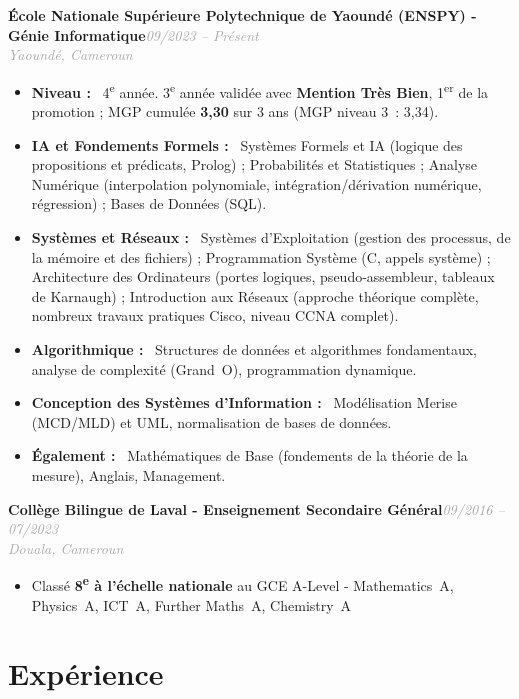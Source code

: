 \documentclass[10pt, a4paper]{article}
\newcommand{\entryhead}[2]{%
  \noindent\textbf{#1}\hfill{\small\textit{\textcolor{darkgray}{#2}}}\\[-4pt]%
}
\newcommand{\entrysub}[1]{%
  {\small\textit{\textcolor{darkgray}{#1}}}\\[2pt]%
}
\newcommand{\blabel}[1]{\textbf{#1}\ }
\begin{document}
\entryhead{École Nationale Supérieure Polytechnique de Yaoundé (ENSPY) - Génie Informatique}{09/2023 -- Présent}
\entrysub{Yaoundé, Cameroun}
\begin{itemize}
  \item \blabel{Niveau :} 4\textsuperscript{e} année. 3\textsuperscript{e} année validée avec
        \textbf{Mention Très Bien}, 1\textsuperscript{er} de la promotion ; MGP cumulée
        \textbf{3,30} sur 3 ans (MGP niveau 3~: 3,34).
  \item \blabel{IA et Fondements Formels :} Systèmes Formels et IA (logique des propositions et
        prédicats, Prolog) ; Probabilités et Statistiques ; Analyse Numérique (interpolation
        polynomiale, intégration/dérivation numérique, régression) ; Bases de Données (SQL).
  \item \blabel{Systèmes et Réseaux :} Systèmes d'Exploitation (gestion des processus, de la
        mémoire et des fichiers) ; Programmation Système (C, appels système) ; Architecture des
        Ordinateurs (portes logiques, pseudo-assembleur, tableaux de Karnaugh) ; Introduction aux
        Réseaux (approche théorique complète, nombreux travaux pratiques Cisco, niveau CCNA
        complet).
  \item \blabel{Algorithmique :} Structures de données et algorithmes fondamentaux, analyse de
        complexité (Grand~O), programmation dynamique.
  \item \blabel{Conception des Systèmes d'Information :} Modélisation Merise (MCD/MLD) et UML,
        normalisation de bases de données.
  \item \blabel{Également :} Mathématiques de Base (fondements de la théorie de la mesure),
        Anglais, Management.
\end{itemize}

\vspace{4pt}
\entryhead{Collège Bilingue de Laval - Enseignement Secondaire Général}{09/2016 -- 07/2023}
\entrysub{Douala, Cameroun}
\begin{itemize}
  \item Classé \textbf{8\textsuperscript{e} à l'échelle nationale} au GCE A-Level -
        Mathematics~A, Physics~A, ICT~A, Further Maths~A, Chemistry~A
\end{itemize}

\section{Expérience}
\end{document}
